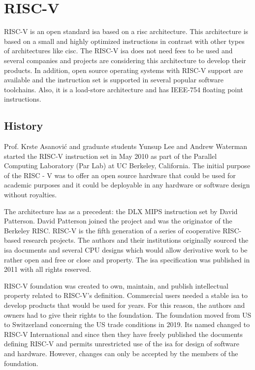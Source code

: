 \section{RISC-V}

RISC-V is an open standard \gls{isa} based on a \gls{risc} architecture. This architecture is based on a small and highly optimized instructions in contrast with other types of architectures like \gls{cisc}. The RISC-V \gls{isa} does not need fees to be used and several companies and projects  are considering this architecture to develop their products. In addition, open source operating systems with RISC-V support are available and the instruction set is supported in several popular software toolchains. Also, it is a load-store architecture and has IEEE-754 floating point instructions. 

\subsection{History}

Prof. Krste Asanović and graduate students Yunsup Lee and Andrew Waterman started the RISC-V instruction set in May 2010 \cite{riscvh} as part of the Parallel Computing Laboratory (Par Lab) at UC Berkeley, California. The initial purpose of the RISC - V was to offer an open source hardware that could be used for academic purposes and it could be deployable in any hardware or software design without royalties.

The architecture has as a precedent: the DLX MIPS instruction set by David Patterson. David Patterson joined the project and was the originator of the Berkeley RISC. RISC-V is the fifth generation of a series of cooperative RISC-based research projects. The authors and their institutions originally sourced the \gls{isa} documents and several CPU designs which would allow derivative work to be rather open and free or close and property. The \gls{isa} specification was published in 2011 with all rights reserved.

RISC-V foundation was created to own, maintain, and publish intellectual property related to RISC-V's definition. Commercial users needed a stable \gls{isa} to develop products that would be used for years. For this reason, the authors and owners had to give their rights to the foundation. The foundation moved from US to Switzerland concerning the US trade conditions in 2019. Its named changed to RISC-V International and since then they have freely published the documents defining RISC-V and permits unrestricted use of the \gls{isa} for design of software and hardware. However, changes can only be accepted by the members of the foundation.

